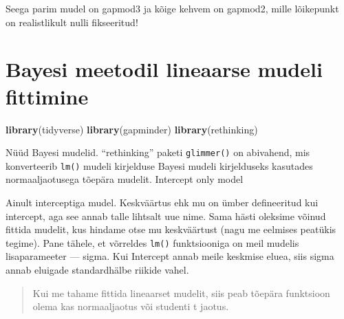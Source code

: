 \documentclass[]{book}
\newenvironment{Shaded}{\begin{snugshade}}{\end{snugshade}}
\newcommand{\CommentTok}[1]{\textcolor[rgb]{0.56,0.35,0.01}{\textit{#1}}}
\newcommand{\DataTypeTok}[1]{\textcolor[rgb]{0.13,0.29,0.53}{#1}}
\newcommand{\DecValTok}[1]{\textcolor[rgb]{0.00,0.00,0.81}{#1}}
\newcommand{\KeywordTok}[1]{\textcolor[rgb]{0.13,0.29,0.53}{\textbf{#1}}}
\newcommand{\NormalTok}[1]{#1}
\newcommand{\OperatorTok}[1]{\textcolor[rgb]{0.81,0.36,0.00}{\textbf{#1}}}
\newcommand{\StringTok}[1]{\textcolor[rgb]{0.31,0.60,0.02}{#1}}
\begin{document}
Seega parim mudel on gapmod3 ja kõige kehvem on gapmod2, mille lõikepunkt on realistlikult nulli fikseeritud!

\hypertarget{bayesi-meetodil-lineaarse-mudeli-fittimine}{%
\chapter{Bayesi meetodil lineaarse mudeli fittimine}\label{bayesi-meetodil-lineaarse-mudeli-fittimine}}

\begin{Shaded}
\begin{Highlighting}[]
\KeywordTok{library}\NormalTok{(tidyverse)}
\KeywordTok{library}\NormalTok{(gapminder)}
\KeywordTok{library}\NormalTok{(rethinking)}
\end{Highlighting}
\end{Shaded}

Nüüd Bayesi mudelid.
``rethinking'' paketi \texttt{glimmer()} on abivahend, mis konverteerib \texttt{lm()} mudeli kirjelduse Bayesi mudeli kirjelduseks kasutades normaaljaotusega tõepära mudelit.
Intercept only model

\begin{Shaded}
\end{Shaded}

Ainult interceptiga mudel.
Keskväärtus ehk mu on ümber defineeritud kui intercept, aga see annab talle lihtsalt uue nime.
Sama hästi oleksime võinud fittida mudelit, kus hindame otse mu keskväärtust (nagu me eelmises peatükis tegime).
Pane tähele, et võrreldes \texttt{lm()} funktsiooniga on meil mudelis lisaparameeter --- sigma.
Kui Intercept annab meile keskmise eluea, siis sigma annab eluigade standardhälbe riikide vahel.

\begin{quote}
Kui me tahame fittida lineaarset mudelit, siis peab tõepära funktsioon olema kas normaaljaotus või studenti t jaotus.
\end{quote}
\end{document}
